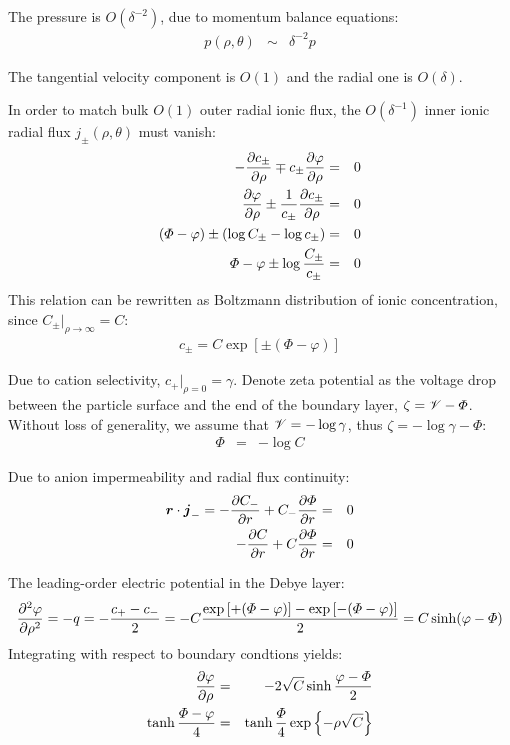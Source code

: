 The pressure is $O(\delta^{-2})$, due to momentum balance equations:
\begin{eqnarray}
 \nonumber p(\rho, \theta) &\sim& \delta^{-2} p
\end{eqnarray}

The tangential velocity component is $O(1)$ and the radial one is $O(\delta)$.

In order to match bulk $O(1)$ outer radial ionic flux, 
the $O(\delta^{-1})$ inner ionic radial flux $j_\pm(\rho, \theta)$ must vanish:
\begin{eqnarray}
 \nonumber -\frac{\partial c_\pm}{\partial \rho} \mp c_\pm \frac{\partial \varphi}{\partial \rho} &=& 0 \\
 \nonumber \frac{\partial \varphi}{\partial \rho} \pm\frac{1}{c_\pm}\frac{\partial c_\pm}{\partial \rho} &=& 0 \\
 \nonumber \left(\varPhi - \varphi\right) \pm\left(\log C_\pm - \log c_\pm\right) &=& 0 \\
 \nonumber \varPhi - \varphi \pm \log \frac{C_\pm}{c_\pm} &=& 0
\end{eqnarray}
This relation can be rewritten as Boltzmann distribution of ionic concentration,
since $C_\pm|_{\rho\rightarrow\infty} = C$:
\begin{eqnarray}
c_\pm = C \exp\left[\pm(\varPhi - \varphi)\right]
\end{eqnarray}

Due to cation selectivity, $c_+|_{\rho=0} = \gamma$.
Denote zeta potential as the voltage drop between the particle surface and the end of
the boundary layer, $\zeta = \mathscr{V} - \varPhi$. 
Without loss of generality, 
we assume that $\mathscr{V} = -\log\gamma$, thus $\zeta = -\log\gamma-\varPhi$:
\begin{eqnarray}
\varPhi &=& -\log C
\end{eqnarray}

Due to anion impermeability and radial flux continuity:
\begin{eqnarray}
 \nonumber \boldsymbol{r} \cdot \boldsymbol{j}_- = -\frac{\partial C_-}{\partial r} + C_- \frac{\partial \varPhi}{\partial r} &=& 0 \\
-\frac{\partial C}{\partial r} + C \frac{\partial \varPhi}{\partial r} &=& 0
\end{eqnarray}

The leading-order electric potential in the Debye layer:
\begin{eqnarray}  \nonumber
\frac{\partial ^2 \varphi}{\partial \rho^2} = -q = -\frac{c_+ - c_-}{2} = 
-C\frac{\exp\left[+(\varPhi - \varphi)\right] - \exp\left[-(\varPhi - \varphi)\right]}{2} = 
C \sinh(\varphi - \varPhi)
\end{eqnarray}
Integrating with respect to boundary condtions yields:
\begin{eqnarray}  \nonumber
\frac{\partial \varphi}{\partial \rho} &=& -2\sqrt{C}\sinh\frac{\varphi - \varPhi}{2} \\  \nonumber
\tanh\frac{\varPhi - \varphi}{4} &=& \tanh\frac{\varPhi}{4} \exp\left\{-\rho \sqrt{C}\right\}
\end{eqnarray}


